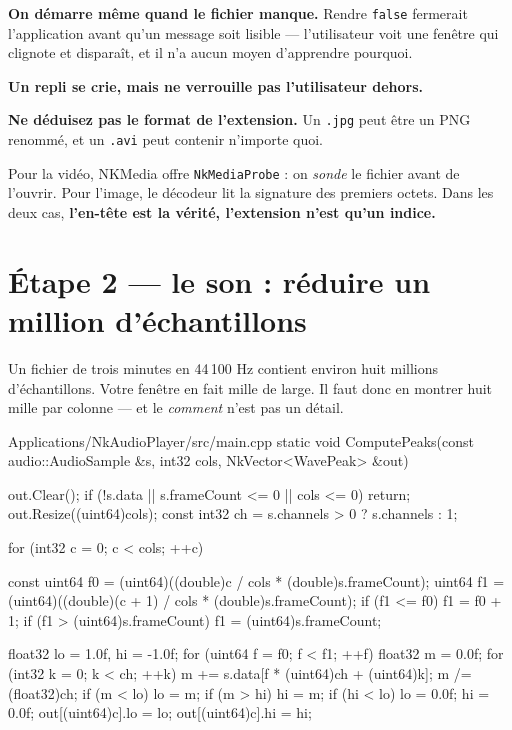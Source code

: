 \begin{nkretenir}
\textbf{On démarre même quand le fichier manque.} Rendre \texttt{false} fermerait
l'application avant qu'un message soit lisible --- l'utilisateur voit une fenêtre
qui clignote et disparaît, et il n'a aucun moyen d'apprendre pourquoi.

\textbf{Un repli se crie, mais ne verrouille pas l'utilisateur dehors.}
\end{nkretenir}

\begin{nkpiege}
\textbf{Ne déduisez pas le format de l'extension.} Un \texttt{.jpg} peut être un
PNG renommé, et un \texttt{.avi} peut contenir n'importe quoi.

Pour la vidéo, NKMedia offre \texttt{NkMediaProbe} : on \emph{sonde} le fichier
avant de l'ouvrir. Pour l'image, le décodeur lit la signature des premiers
octets. Dans les deux cas, \textbf{l'en-tête est la vérité, l'extension n'est
qu'un indice.}
\end{nkpiege}

\section{Étape 2 --- le son : réduire un million d'échantillons}

Un fichier de trois minutes en 44\,100 Hz contient environ huit millions
d'échantillons. Votre fenêtre en fait mille de large. Il faut donc en montrer
huit mille par colonne --- et le \emph{comment} n'est pas un détail.

\begin{nkcode}{Applications/NkAudioPlayer/src/main.cpp}
static void ComputePeaks(const audio::AudioSample &s, int32 cols,
                         NkVector<WavePeak> &out) {
    out.Clear();
    if (!s.data || s.frameCount <= 0 || cols <= 0) { return; }
    out.Resize((uint64)cols);
    const int32 ch = s.channels > 0 ? s.channels : 1;

    for (int32 c = 0; c < cols; ++c) {
        const uint64 f0 = (uint64)((double)c / cols * (double)s.frameCount);
        uint64 f1 = (uint64)((double)(c + 1) / cols * (double)s.frameCount);
        if (f1 <= f0) { f1 = f0 + 1; }
        if (f1 > (uint64)s.frameCount) { f1 = (uint64)s.frameCount; }

        float32 lo = 1.0f, hi = -1.0f;
        for (uint64 f = f0; f < f1; ++f) {
            float32 m = 0.0f;
            for (int32 k = 0; k < ch; ++k) { m += s.data[f * (uint64)ch + (uint64)k]; }
            m /= (float32)ch;
            if (m < lo) { lo = m; }
            if (m > hi) { hi = m; }
        }
        if (hi < lo) { lo = 0.0f; hi = 0.0f; }
        out[(uint64)c].lo = lo;
        out[(uint64)c].hi = hi;
    }
}
\end{nkcode}

